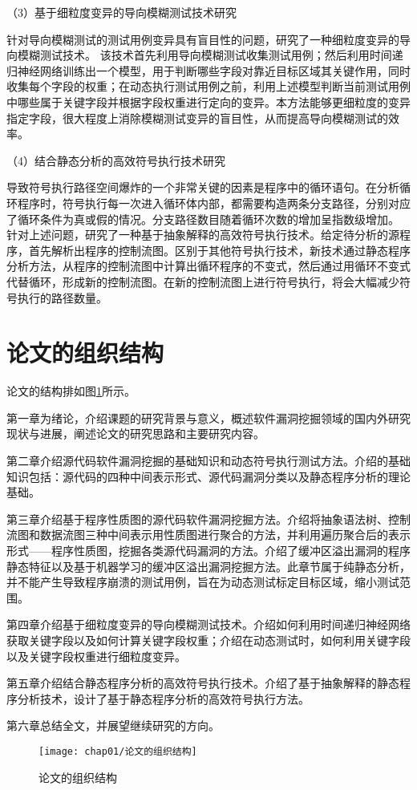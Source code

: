 （3）基于细粒度变异的导向模糊测试技术研究

针对导向模糊测试的测试用例变异具有盲目性的问题，研究了一种细粒度变异的导向模糊测试技术。
该技术首先利用导向模糊测试收集测试用例；然后利用时间递归神经网络训练出一个模型，用于判断哪些字段对靠近目标区域其关键作用，同时收集每个字段的权重；在动态执行测试用例之前，利用上述模型判断当前测试用例中哪些属于关键字段并根据字段权重进行定向的变异。本方法能够更细粒度的变异指定字段，很大程度上消除模糊测试变异的盲目性，从而提高导向模糊测试的效率。

（4）结合静态分析的高效符号执行技术研究

导致符号执行路径空间爆炸的一个非常关键的因素是程序中的循环语句。在分析循环程序时，符号执行每一次进入循环体内部，都需要构造两条分支路径，分别对应了循环条件为真或假的情况。分支路径数目随着循环次数的增加呈指数级增加。
针对上述问题，研究了一种基于抽象解释的高效符号执行技术。给定待分析的源程序，首先解析出程序的控制流图。区别于其他符号执行技术，新技术通过静态程序分析方法，从程序的控制流图中计算出循环程序的不变式，然后通过用循环不变式代替循环，形成新的控制流图。在新的控制流图上进行符号执行，将会大幅减少符号执行的路径数量。




\section{论文的组织结构}

论文的结构排如图\ref{论文的组织结构}所示。

第一章为绪论，介绍课题的研究背景与意义，概述软件漏洞挖掘领域的国内外研究现状与进展，阐述论文的研究思路和主要研究内容。

第二章介绍源代码软件漏洞挖掘的基础知识和动态符号执行测试方法。介绍的基础知识包括：源代码的四种中间表示形式、源代码漏洞分类以及静态程序分析的理论基础。

第三章介绍基于程序性质图的源代码软件漏洞挖掘方法。介绍将抽象语法树、控制流图和数据流图三种中间表示用性质图进行聚合的方法，并利用遍历聚合后的表示形式——程序性质图，挖掘各类源代码漏洞的方法。介绍了缓冲区溢出漏洞的程序静态特征以及基于机器学习的缓冲区溢出漏洞挖掘方法。此章节属于纯静态分析，并不能产生导致程序崩溃的测试用例，旨在为动态测试标定目标区域，缩小测试范围。

第四章介绍基于细粒度变异的导向模糊测试技术。介绍如何利用时间递归神经网络获取关键字段以及如何计算关键字段权重；介绍在动态测试时，如何利用关键字段以及关键字段权重进行细粒度变异。

第五章介绍结合静态程序分析的高效符号执行技术。介绍了基于抽象解释的静态程序分析技术，设计了基于静态程序分析的高效符号执行方法。


第六章总结全文，并展望继续研究的方向。


\begin{figure}[htb]
\begin{center}
\texttt{[image: chap01/论文的组织结构]}
\end{center}
\caption{论文的组织结构}
\label{论文的组织结构}
\end{figure}
